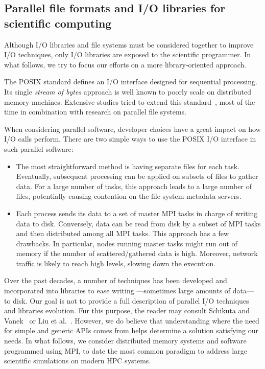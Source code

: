 \subsection{Parallel file formats and I/O libraries for scientific computing}

Although I/O libraries and file systems must be considered together to improve
I/O techniques, only I/O libraries are exposed to the scientific programmer. In
what follows, we try to focus our efforts on a more library-oriented approach.

The POSIX standard defines an I/O interface designed for sequential processing.
Its single \emph{stream of bytes} approach is well known to poorly scale on
distributed memory machines. Extensive studies tried to extend this
standard~\cite{Vilayannur2008}, most of the time in combination with research on
parallel file systems.%

When considering parallel software, developer choices have a great impact on how
I/O calls perform. There are two simple ways to use the POSIX I/O interface in
such parallel software:
\begin{itemize}
\item The most straightforward method is having separate files for each task.
Eventually, subsequent processing can be applied on subsets of files to gather data.
For a large number of tasks, this approach leads to a large number of files,
potentially causing contention on the file system metadata servers.
\item Each process sends its data to a set of master MPI tasks in charge of
writing data to disk. Conversely, data can be read from disk by a subset of MPI
tasks and then distributed among all MPI tasks. This approach has a few
drawbacks. In particular, nodes running master tasks might run out of memory if
the number of scattered/gathered data is high. Moreover, network traffic is
likely to reach high levels, slowing down the execution.
\end{itemize}

Over the past decades, a number of techniques has been developed and
incorporated into libraries  to ease writing ---sometimes large amounts of data---
to disk.
Our goal is not to provide a full description of parallel I/O techniques and
libraries evolution. Fur this purpose, the reader may consult Schikuta and
Vanek~\cite{Schikuta2001} or Liu et al.~\cite{Liu2013}. However, we do believe
that understanding where the need for simple and generic APIs comes from helps
determine a solution satisfying our needs. In what follows, we consider
distributed memory systems and software programmed using MPI, to date the most
common paradigm to address large scientific simulations on modern HPC systems.

